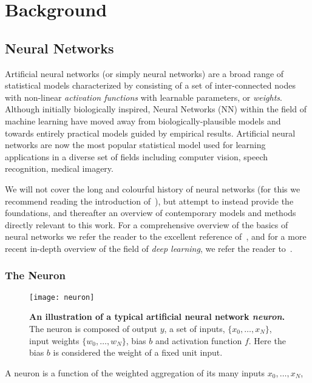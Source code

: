 \documentclass[thesis]{subfiles}
\begin{document}


\chapter{Background}
\label{background}

\section{Neural Networks}
Artificial neural networks (or simply neural networks) are a broad range of statistical models characterized by consisting of a set of inter-connected nodes with non-linear \emph{activation functions} with learnable parameters, or \emph{weights}.
 Although initially biologically inspired, Neural Networks (NN) within the field of machine learning have moved away from biologically-plausible models and towards entirely practical models guided by empirical results. Artificial neural networks are now the most popular statistical model used for learning applications in a diverse set of fields including computer vision, speech recognition, medical imagery. 

We will not cover the long and colourful history of neural networks (for this we recommend reading the introduction of~\citet{goodfellow2016deep}), but attempt to instead provide the foundations, and thereafter an overview of contemporary models and methods directly relevant to this work. For a comprehensive overview of the basics of neural networks we refer the reader to the excellent reference of~\citet{Bishop1995}, and for a more recent  in-depth overview of the field of \emph{deep learning}, we refer the reader to~\citet{goodfellow2016deep}. 

\subsection{The Neuron}

\begin{figure}[tbp]
\centering
\texttt{[image: neuron]}
\caption[An illustration of a typical artificial neural network neuron.]{\textbf{An illustration of a typical artificial neural network \emph{neuron}.} The neuron is composed of output $y$, a set of inputs, $\{x_0, \ldots, x_N\}$, input weights $\{w_0, \ldots, w_N\}$, bias $b$ and activation function $f$. Here the bias $b$ is considered the weight of a fixed unit input.}
\label{fig:neuron}
\end{figure}
A neuron is a function of the weighted aggregation of its many inputs ${x_0,\ldots,x_N}$,
\end{document}
